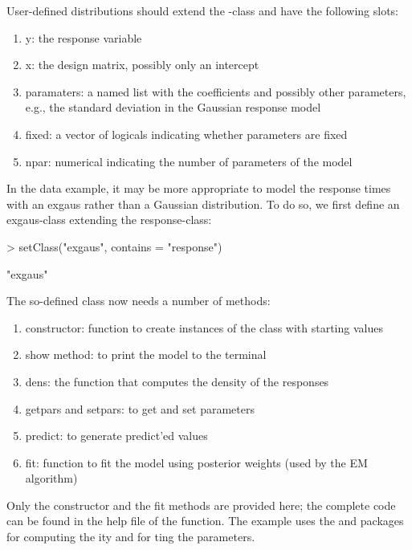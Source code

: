 \documentclass[article]{jss}
\begin{document}
User-defined distributions should extend the -class and
have the following slots:
\begin{enumerate}
	\item y: the response variable
	\item x: the design matrix, possibly only an intercept
	\item paramaters: a named list with the coefficients and possibly 
	other parameters, e.g., the standard deviation in the Gaussian 
	response model
	\item fixed: a vector of logicals indicating whether parameters are 
	fixed
	\item npar: numerical indicating the number of parameters of the model
\end{enumerate}

In the  data example, it may be more appropriate to model
the response times with an exgaus rather than a Gaussian distribution.
To do so, we first define an exgaus-class extending the
response-class:
\begin{Schunk}
\begin{Sinput}
> setClass("exgaus", contains = "response")
\end{Sinput}
\begin{Soutput}
[1] "exgaus"
\end{Soutput}
\end{Schunk}

The so-defined class now needs a number of methods: 
\begin{enumerate}
	\item constructor: function to create instances of the class 
	with starting values
	\item show method: to print the model to the terminal
	\item dens: the function that computes the density of the responses
	\item getpars and setpars: to get and set parameters 
	\item predict: to generate predict'ed values 
	\item fit: function to fit the model using posterior weights (used 
	by the EM algorithm)
\end{enumerate}

Only the constructor and the fit methods are provided here; the
complete code can be found in the help file of the 
function.  The  example uses the  and
 packages
\citep{Stasinopoulos2009a,Stasinopoulos2009b} for computing the
ity and for ting the parameters.
\end{document}
